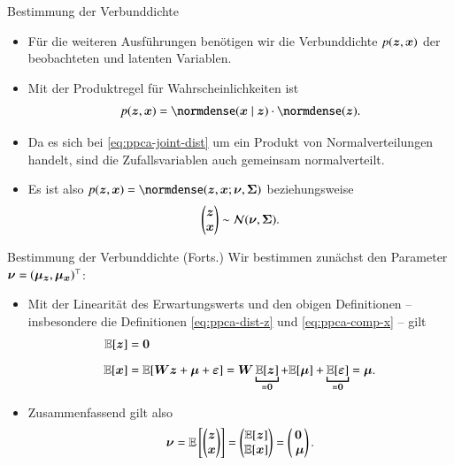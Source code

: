 \begin{frame}{Bestimmung der Verbunddichte}{}
	\begin{itemize}
		\item Für die weiteren Ausführungen benötigen wir die Verbunddichte $p(\bm{z}, \bm{x})$
			der beobachteten und latenten Variablen.
		\item Mit der Produktregel für Wahrscheinlichkeiten ist
		\begin{equation} \label{eq:ppca-joint-dist}
			p(\bz, \bx) = \normdense(\bx \mid \bz) \cdot \normdense(\bz).
		\end{equation}
		\item Da es sich bei \eqref{eq:ppca-joint-dist} um ein Produkt von Normalverteilungen handelt,
			sind die Zufallsvariablen auch gemeinsam normalverteilt.
		\item Es ist also $p(\bz, \bx) = \normdense(\bz, \bx; \bnu, \bSigma)$ beziehungsweise
		\begin{equation}
			\begin{pmatrix} \bm{z} \\ \bm{x} \end{pmatrix} \sim \mathcal{N}(\bm{\nu}, \bm{\Sigma}).
		\end{equation}
	\end{itemize}
\end{frame}


\begin{frame}{Bestimmung der Verbunddichte (Forts.)}{}
	Wir bestimmen zunächst den Parameter $\bm{\nu} = (\bm{\mu}_{\bm{z}}, \bm{\mu}_{\bm{x}})^\top$:
	\begin{itemize}
		\item Mit der Linearität des Erwartungswerts und den obigen Definitionen --
			insbesondere die Definitionen \eqref{eq:ppca-dist-z} und \eqref{eq:ppca-comp-x} -- gilt
		\begin{align*}
			\E[\bz]
				&= \0
		\\[2mm]
			\E[\bx]
				&= \E[\bW \bz + \bmu + \beps]
				= \bW \underbracket{\E[\bz]}_{= \0} + \E[\bmu] + \underbracket{\E[\beps]}_{= \0}
				= \bmu.
		\end{align*}
		\item Zusammenfassend gilt also
		\begin{equation} \label{eq:ppca-expectation-joint-dist}
			\bnu
				= \E\left[ \begin{pmatrix} \bz \\ \bx \end{pmatrix} \right]
				= \begin{pmatrix} \E[\bz] \\ \E[\bx] \end{pmatrix}
				= \begin{pmatrix} \0 \\ \bmu \end{pmatrix}.
		\end{equation}
	\end{itemize}
\end{frame}


